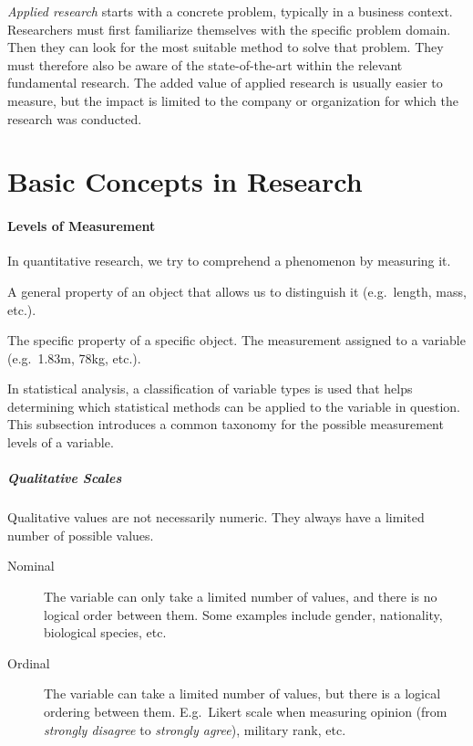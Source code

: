 \emph{Applied research} starts with a concrete problem, typically in a business context. Researchers must first familiarize themselves with the specific problem domain. Then they can look for the most suitable method to solve that problem. They must therefore also be aware of the state-of-the-art within the relevant fundamental research. The added value of applied research is usually easier to measure, but the impact is limited to the company or organization for which the research was conducted.

\section{Basic Concepts in Research}

\paragraph{Levels of Measurement}

In quantitative research, we try to comprehend a phenomenon by measuring it.

\begin{definition}[Variable]
     A general property of an object that allows us to distinguish it (e.g.~length, mass, etc.).
\end{definition}

\begin{definition}[Value]
    The specific property of a specific object. The measurement assigned to a variable (e.g.~1.83m, 78kg, etc.).
\end{definition}

In statistical analysis, a classification of variable types is used that helps determining which statistical methods can be applied to the variable in question. 
This subsection introduces a common taxonomy for the possible measurement levels of a variable.

\subparagraph{Qualitative Scales}

Qualitative values are not necessarily numeric.
They always have a limited number of possible values.

\begin{description}
    \item [Nominal] The variable can only take a limited number of values, and there is no logical order between them. Some examples include gender, nationality, biological species, etc.
    \item [Ordinal] The variable can take a limited number of values, but there is a logical ordering between them. E.g.~Likert scale when measuring opinion (from \emph{strongly disagree} to \emph{strongly agree}), military rank, etc.	
\end{description}

